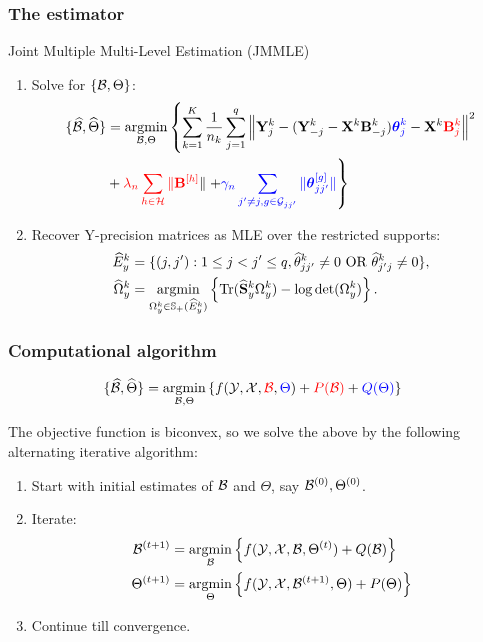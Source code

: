 \documentclass[10pt]{beamer}
\theoremstyle{definition}
\DeclareMathOperator*{\Tr}{Tr}
\DeclareMathOperator*{\argmin}{argmin}
\begin{document}
\begin{frame}
\frametitle{The estimator}

\begin{center}
{\colrbf Joint Multiple Multi-Level Estimation (JMMLE)}
\end{center}

\begin{enumerate}
\item Solve for $\{ {\cal{B}}, \Theta\}$:
%
\begin{align*}
\{ \widehat \cB, \widehat \Theta \} &=
\argmin_{\cB, \Theta} \left\{ \sum_{k=1}^K \frac{1}{n_k} \sum_{j=1}^q
\left\| \bfY_j^k - ( \bfY_{-j}^k - \bfX^k \bfB_{-j}^k) {\colb \bftheta_j^k}
- \bfX^k {\colr \bfB_j^k} \right\|^2 \right.\\
& + {\colr \lambda_n \sum_{h \in \cH} \| \bfB^{[h]}} \|
\left. + {\colb \gamma_n  \sum_{j' \neq j, g \in \cG_{jj'}} \| \bftheta_{jj'}^{[g]} \|} \right\}
\end{align*}

\item Recover Y-precision matrices as MLE over the restricted supports: %
%
\begin{align*}
\widehat E_y^k &= \{(j,j'): 1 \leq j < j' \leq q, \widehat \theta_{jj'}^k \neq 0 \text{ OR } \widehat \theta_{j'j}^k \neq 0 \},\\
\widehat \Omega_y^k &= \argmin_{\Omega_y^k \in \BS_+ (\widehat E_y^k)}
\left\{ \Tr (\widehat \bfS_y^k \Omega_y^k ) - \log \det (\Omega_y^k) \right\}.
\end{align*}
%
\end{enumerate}

\end{frame}
\begin{frame}
\frametitle{Computational algorithm}
\begin{align*}
\{ \widehat \cB, \widehat \Theta \} &= \argmin_{\cB, \Theta}
\left\{ f(\cY, \cX, {\colr \cB}, {\colb \Theta}) + {\colr P(\cB)} + {\colb Q(\Theta)} \right\}
\end{align*}

The objective function is biconvex, so we solve the above by the following alternating iterative algorithm:

\begin{enumerate}
\item Start with initial estimates of ${\cal{B}}$ and $\Theta$, say ${\cal{B}}^{(0)}, \Theta^{(0)}$.
\item Iterate:
%
\begin{align*}
\cB^{(t+1)} &= \argmin_\cB \left\{ f ( \cY, \cX, \cB, \Theta^{(t)}) + Q (\cB) \right\}\\
\Theta^{(t+1)} &= \argmin_\Theta \left\{ f ( \cY, \cX, \cB^{(t+1)}, \Theta) + P (\Theta) \right\}
\end{align*}
\item Continue till convergence.
\end{enumerate}
\end{frame}
\end{document}
